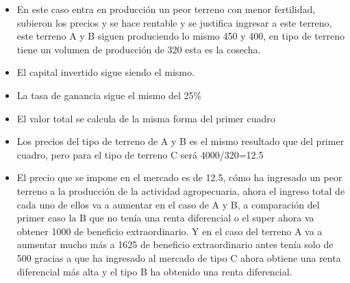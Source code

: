 \documentclass[
  a4paper,
]{article}
\begin{document}
\begin{itemize}
\item
  En este caso entra en producción un peor terreno con menor fertilidad,
  subieron los precios y se hace rentable y se justifica ingresar a este
  terreno, este terreno A y B siguen produciendo lo mismo 450 y 400, en
  tipo de terreno tiene un volumen de producción de 320 esta es la
  cosecha.
\item
  El capital invertido sigue siendo el mismo.
\item
  La tasa de ganancia sigue el mismo del 25\%
\item
  El valor total se calcula de la misma forma del primer cuadro
\item
  Los precios del tipo de terreno de A y B es el mismo resultado que del
  primer cuadro, pero para el tipo de terreno C será 4000/320=12.5
\item
  El precio que se impone en el mercado es de 12.5, cómo ha ingresado un
  peor terreno a la producción de la actividad agropecuaria, ahora el
  ingreso total de cada uno de ellos va a aumentar en el caso de A y B,
  a comparación del primer caso la B que no tenía una renta diferencial
  o el super ahora va obtener 1000 de beneficio extraordinario. Y en el
  caso del terreno A va a aumentar mucho más a 1625 de beneficio
  extraordinario antes tenía solo de 500 gracias a que ha ingresado al
  mercado de tipo C ahora obtiene una renta diferencial más alta y el
  tipo B ha obtenido una renta diferencial.
\end{itemize}
\end{document}
